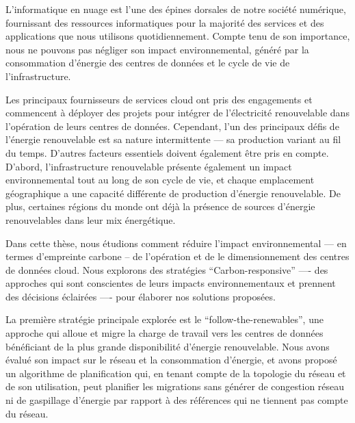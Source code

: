 
L'informatique en nuage est l'une des épines dorsales de notre société numérique, fournissant des ressources informatiques pour la majorité des services et des applications que nous utilisons quotidiennement. Compte tenu de son importance, nous ne pouvons pas négliger son impact environnemental, généré par la consommation d'énergie des centres de données et le cycle de vie de l'infrastructure.

Les principaux fournisseurs de services cloud ont pris des engagements et commencent à déployer des projets pour intégrer de l'électricité renouvelable dans l'opération de leurs centres de données. Cependant, l'un des principaux défis de l'énergie renouvelable est sa nature intermittente --- sa production variant au fil du temps. D'autres facteurs essentiels doivent également être pris en compte. D'abord, l'infrastructure renouvelable présente également un impact environnemental tout au long de son cycle de vie, et chaque emplacement géographique a une capacité différente de production d'énergie renouvelable. De plus, certaines régions du monde ont déjà la présence de sources d'énergie renouvelables dans leur mix énergétique.

Dans cette thèse, nous étudions comment réduire l'impact environnemental --- en termes d'empreinte carbone -- de l'opération et de le dimensionnement des centres de données cloud. Nous explorons des stratégies ``Carbon-responsive'' ---- des approches qui sont conscientes de leurs impacts environnementaux et prennent des décisions éclairées ---- pour élaborer nos solutions proposées.

La première stratégie principale explorée est le  ``follow-the-renewables'', une approche qui alloue et migre la charge de travail vers les centres de données bénéficiant de la plus grande disponibilité d'énergie renouvelable. Nous avons évalué son impact sur le réseau et la consommation d'énergie, et avons proposé un algorithme de planification qui, en tenant compte de la topologie du réseau et de son utilisation, peut planifier les migrations sans générer de congestion réseau ni de gaspillage d'énergie par rapport à des références qui ne tiennent pas compte du réseau.

